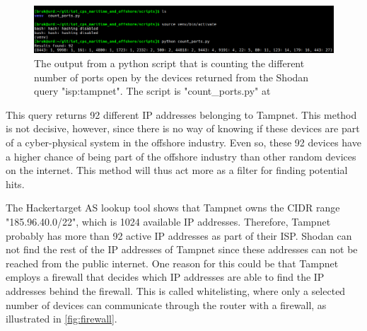 \begin{figure} [H]
    \centering
    \includegraphics[scale=0.35]{Figurer/python_ports.png}
    \caption{The output from a python script that is counting the different number of ports open by the devices returned from the Shodan query "isp:tampnet". The script is "count\_ports.py" at \cite{scripts}}
    \label{fig:tampnet_ports}
\end{figure}

This query returns 92 different IP addresses belonging to Tampnet. This method is not decisive, however, since there is no way of knowing if these devices are part of a cyber-physical system in the offshore industry. Even so, these 92 devices have a higher chance of being part of the offshore industry than other random devices on the internet. This method will thus act more as a filter for finding potential hits. 

The Hackertarget AS lookup tool \cite{asip_lookup} shows that Tampnet owns the CIDR range "185.96.40.0/22", which is 1024 available IP addresses. \cite{CIDR_table} Therefore, Tampnet probably has more than 92 active IP addresses as part of their ISP. Shodan can not find the rest of the IP addresses of Tampnet since these addresses can not be reached from the public internet. One reason for this could be that Tampnet employs a firewall that decides which IP addresses are able to find the IP addresses behind the firewall. This is called whitelisting, where only a selected number of devices can communicate through the router with a firewall, as illustrated in \cref{fig:firewall}.


